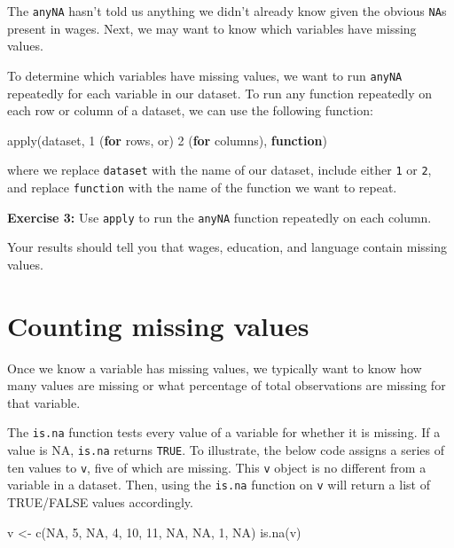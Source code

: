 \documentclass[
]{book}
\makeatletter
\newenvironment{Shaded}{\begin{snugshade}}{\end{snugshade}}
\newcommand{\ConstantTok}[1]{\textcolor[rgb]{0,0,0}{#1}}
\newcommand{\ControlFlowTok}[1]{\textcolor[rgb]{0.27,0.27,0.27}{\textbf{#1}}}
\newcommand{\DecValTok}[1]{\textcolor[rgb]{0.06,0.06,0.06}{#1}}
\newcommand{\FunctionTok}[1]{\textcolor[rgb]{0,0,0}{#1}}
\newcommand{\NormalTok}[1]{#1}
\newcommand{\OtherTok}[1]{\textcolor[rgb]{0.37,0.37,0.37}{#1}}
\newenvironment{kframe}{%
\medskip{}
\setlength{\fboxsep}{.8em}
 \def\at@end@of@kframe{}%
 \ifinner\ifhmode%
  \def\at@end@of@kframe{\end{minipage}}%
  \begin{minipage}{\columnwidth}%
 \fi\fi%
 \def\FrameCommand##1{\hskip\@totalleftmargin \hskip-\fboxsep
 \colorbox{shadecolor}{##1}\hskip-\fboxsep
     \hskip-\linewidth \hskip-\@totalleftmargin \hskip\columnwidth}%
 \MakeFramed {\advance\hsize-\width
   \@totalleftmargin\z@ \linewidth\hsize
   \@setminipage}}%
 {\par\unskip\endMakeFramed%
 \at@end@of@kframe}
\renewenvironment{Shaded}{\begin{kframe}}{\end{kframe}}
\newenvironment{rmdblock}[1]
  {\begin{shaded*}
  }
  {\end{shaded*}
  }
\newenvironment{learncheck}
  {\begin{rmdblock}{warning}}
  {\end{rmdblock}}
\makeatother
\begin{document}
The \texttt{anyNA} hasn't told us anything we didn't already know given the obvious \texttt{NA}s present in wages. Next, we may want to know which variables have missing values.

To determine which variables have missing values, we want to run \texttt{anyNA} repeatedly for each variable in our dataset. To run any function repeatedly on each row or column of a dataset, we can use the following function:

\begin{Shaded}
\begin{Highlighting}[]
\FunctionTok{apply}\NormalTok{(dataset, }\DecValTok{1}\NormalTok{ (}\ControlFlowTok{for}\NormalTok{ rows, or) }\DecValTok{2}\NormalTok{ (}\ControlFlowTok{for}\NormalTok{ columns), }\ControlFlowTok{function}\NormalTok{)}
\end{Highlighting}
\end{Shaded}

where we replace \texttt{dataset} with the name of our dataset, include either \texttt{1} or \texttt{2}, and replace \texttt{function} with the name of the function we want to repeat.

\begin{learncheck}
\textbf{Exercise 3:} Use \texttt{apply} to run the \texttt{anyNA}
function repeatedly on each column.
\end{learncheck}

Your results should tell you that wages, education, and language contain missing values.

\hypertarget{counting-missing-values}{%
\section{Counting missing values}\label{counting-missing-values}}

Once we know a variable has missing values, we typically want to know how many values are missing or what percentage of total observations are missing for that variable.

The \texttt{is.na} function tests every value of a variable for whether it is missing. If a value is NA, \texttt{is.na} returns \texttt{TRUE}. To illustrate, the below code assigns a series of ten values to \texttt{v}, five of which are missing. This \texttt{v} object is no different from a variable in a dataset. Then, using the \texttt{is.na} function on \texttt{v} will return a list of TRUE/FALSE values accordingly.

\begin{Shaded}
\begin{Highlighting}[]
\NormalTok{v }\OtherTok{\textless{}{-}} \FunctionTok{c}\NormalTok{(}\ConstantTok{NA}\NormalTok{, }\DecValTok{5}\NormalTok{, }\ConstantTok{NA}\NormalTok{, }\DecValTok{4}\NormalTok{, }\DecValTok{10}\NormalTok{, }\DecValTok{11}\NormalTok{, }\ConstantTok{NA}\NormalTok{, }\ConstantTok{NA}\NormalTok{, }\DecValTok{1}\NormalTok{, }\ConstantTok{NA}\NormalTok{)}
\FunctionTok{is.na}\NormalTok{(v)}
\end{Highlighting}
\end{Shaded}
\end{document}
